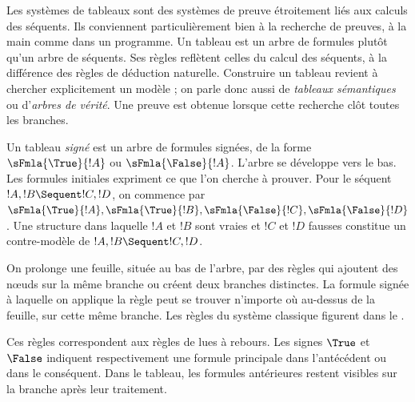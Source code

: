 \documentclass[../../../include/open-logic-section]{subfiles}
\begin{document}


Les systèmes de tableaux sont des systèmes de preuve
étroitement liés aux calculs des séquents. Ils conviennent
particulièrement bien à la recherche de preuves, à la
main comme dans un programme. Un tableau est un arbre
de formules plutôt qu'un arbre de séquents. Ses règles
reflètent celles du calcul des séquents, à la différence
des règles de déduction naturelle. Construire un tableau
revient à chercher explicitement un modèle ; on parle
donc aussi de \emph{tableaux sémantiques} ou
d'\emph{arbres de vérité}. Une preuve est obtenue
lorsque cette recherche clôt toutes les branches.

Un tableau \emph{signé} est un arbre de formules
signées, de la forme $\sFmla{\True}{!A}$ ou
$\sFmla{\False}{!A}$. L'arbre se développe vers
le bas. Les formules initiales expriment ce que
l'on cherche à prouver. Pour le séquent
$!A, !B \Sequent !C, !D$, on commence par
$\sFmla{\True}{!A}, \sFmla{\True}{!B},
\sFmla{\False}{!C}, \sFmla{\False}{!D}$.
Une structure dans laquelle $!A$ et $!B$ sont
vraies et $!C$ et $!D$ fausses constitue un
contre-modèle de $!A, !B \Sequent !C, !D$.

On prolonge une feuille, située au bas de l'arbre,
par des règles qui ajoutent des nœuds sur la même
branche ou créent deux branches distinctes.
La formule signée à laquelle on applique la
règle peut se trouver n'importe où au-dessus
de la feuille, sur cette même branche.
Les règles du système classique 
figurent dans le .



Ces règles correspondent aux règles de 
lues à rebours. Les signes $\True$ et $\False$
indiquent respectivement une formule principale
dans l'antécédent ou dans le conséquent.
Dans le tableau, les formules antérieures restent
visibles sur la branche après leur traitement.
\end{document}
